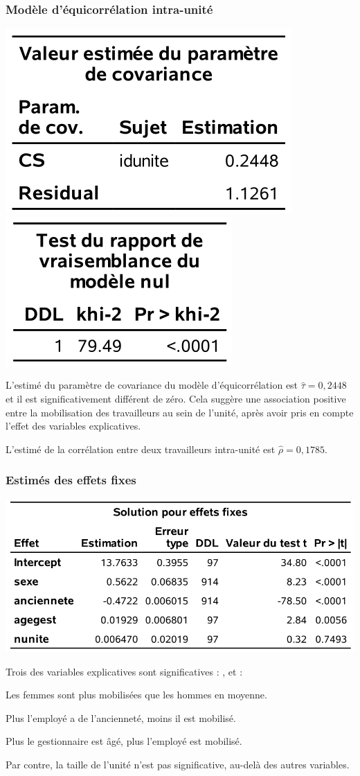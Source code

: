 \documentclass{beamer}
\begin{document}
 \begin{frame}
\frametitle{Modèle d'équicorrélation intra-unité}
\begin{center}
\includegraphics[width = 0.42\linewidth]{img/c6/diapos7-e08}
\includegraphics[width = 0.32\linewidth]{img/c6/diapos7-e09}
\end{center}
\bi
\item L'estimé du paramètre de covariance du modèle d'équicorrélation est $\hat{\tau} = 0,2448$ et il est significativement différent de zéro. Cela suggère une association positive entre la mobilisation des travailleurs au sein de l'unité, après avoir pris en compte l'effet des variables explicatives.
\item L'estimé de la corrélation entre deux travailleurs intra-unité  est $\hat{\rho} = 0,1785$.
\ei
\end{frame}



 \begin{frame}
\frametitle{Estimés des effets fixes}
\begin{center}
\includegraphics[width = 0.7\linewidth]{img/c6/diapos7-e10}
\end{center}
\bi
\item Trois des variables explicatives sont significatives : ,  et :
\bi
\item Les femmes sont plus mobilisées que les hommes en moyenne.
\item Plus l'employé a de l'ancienneté, moins il est mobilisé.
\item Plus le gestionnaire est âgé, plus l'employé est mobilisé.
\ei
\item Par contre, la taille de l'unité  n'est pas significative, au-delà des autres variables.
\ei
\end{frame}
\end{document}
